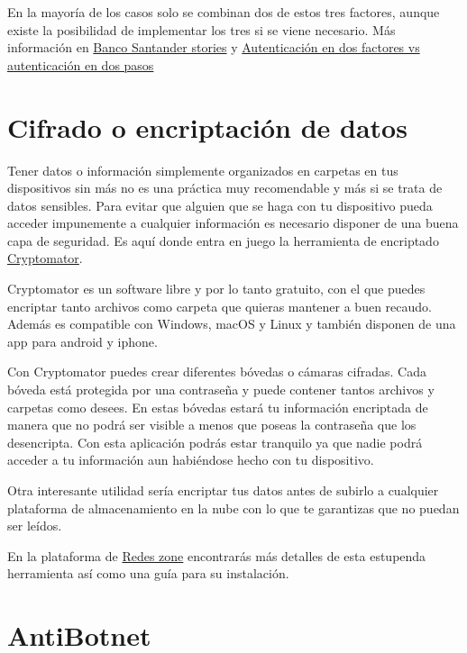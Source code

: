\documentclass[
  spanish,
  a4paper,
  openany]{book}
\begin{document}
En la mayoría de los casos solo se combinan dos de estos tres factores, aunque existe la posibilidad de implementar los tres si se viene necesario. Más información en \href{https://www.santander.com/es/stories/pon-una-capa-extra-de-seguridad-online-con-la-autenticacion-multifactor}{Banco Santander stories} y \href{https://protegermipc.net/2016/03/18/autenticacion-en-dos-factores-vs-autenticacion-en-dos-pasos/}{Autenticación en dos factores vs autenticación en dos pasos}

\hypertarget{cifrado-o-encriptaciuxf3n-de-datos}{%
\section{Cifrado o encriptación de datos}\label{cifrado-o-encriptaciuxf3n-de-datos}}

Tener datos o información simplemente organizados en carpetas en tus dispositivos sin más no es una práctica muy recomendable y más si se trata de datos sensibles. Para evitar que alguien que se haga con tu dispositivo pueda acceder impunemente a cualquier información es necesario disponer de una buena capa de seguridad. Es aquí donde entra en juego la herramienta de encriptado \href{https://cryptomator.org/}{Cryptomator}.

Cryptomator es un software libre y por lo tanto gratuito, con el que puedes encriptar tanto archivos como carpeta que quieras mantener a buen recaudo. Además es compatible con Windows, macOS y Linux y también disponen de una app para android y iphone.

Con Cryptomator puedes crear diferentes bóvedas o cámaras cifradas. Cada bóveda está protegida por una contraseña y puede contener tantos archivos y carpetas como desees. En estas bóvedas estará tu información encriptada de manera que no podrá ser visible a menos que poseas la contraseña que los desencripta. Con esta aplicación podrás estar tranquilo ya que nadie podrá acceder a tu información aun habiéndose hecho con tu dispositivo.

Otra interesante utilidad sería encriptar tus datos antes de subirlo a cualquier plataforma de almacenamiento en la nube con lo que te garantizas que no puedan ser leídos.

En la plataforma de \href{https://www.redeszone.net/tutoriales/seguridad/cryptomator-encriptar-archivos-carpetas/}{Redes zone} encontrarás más detalles de esta estupenda herramienta así como una guía para su instalación.

\hypertarget{antibotnet}{%
\section{AntiBotnet}\label{antibotnet}}
\end{document}
